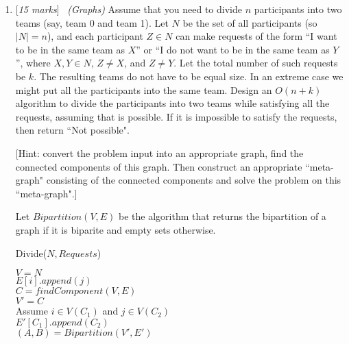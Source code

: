 \documentclass[11pt]{article}
\newcommand{\Q}[1]{\medskip\item {[{\em #1 marks\/}]}\ }
\begin{document}
\begin{enumerate}
\begin{enumerate}
Whether there exists a subset $A$ of $\{a_1, \dots, a_n\}$ such that $|A| = k$ and $|\sum_{a \in A} a - W| = b$ 
for some value $b$.

\newpage
\Q{3} Argue briefly that if we could solve your decision problem in (g) in time
polynomial in the number of input bits, then we could also compute the 
minimum value in time polynomial in the number of input bits.

Since $\left|\sum_{i\in S} a_i - W\right|$ is bounded. So there are finite possible values of 
$\left|\sum_{i\in S} a_i - W\right|$. So we just loop throught all possible values. Intuitively, this takes 
polynomial time in the number of input bits.

\newpage
\end{enumerate}
\Q{15} {\em (Graphs)} Assume that you need to divide $n$ participants into two teams (say, team 0 and team 1). Let $N$ be the set of all participants (so $|N| = n$), and each participant $Z \in N$ can make requests of the form ``I want to be in the same team as $X$'' or ``I do not want to be in the same team as $Y$'', where $X, Y \in N$, $Z \neq X$, and $Z \neq Y$. Let the total number of such requests be $k$. The resulting teams do not have to be equal size. In an extreme case we might put all the participants into the same team. Design an $O(n+k)$ algorithm to divide the participants into two teams while satisfying all the requests, assuming that is possible. If it is impossible to satisfy the requests, then return ``Not possible". 

[Hint: convert the problem input into an appropriate graph, find the connected components of this graph. Then construct an appropriate ``meta-graph" consisting of the connected components and solve the problem on this ``meta-graph".] 

Let $Bipartition(V, E)$ be the algorithm that returns the bipartition of a graph if it is biparite and empty sets 
otherwise.

\begin{algorithm}[h]
    \caption{Divide($N, Requests$)}
    $V= N$\\
     {
        $E[i].append(j)$\\
    }
    $C = findComponent(V, E)$\\
     {
    }
    $V' = C$\\
     {
        Assume $i \in V(C_1)$ and $j \in V(C_2)$\\
        $E'[C_1].append(C_2)$\\
    }
    $(A, B) = Bipartition(V', E')$\\
     {
    } 
\end{algorithm}


\end{enumerate}
\end{document}
